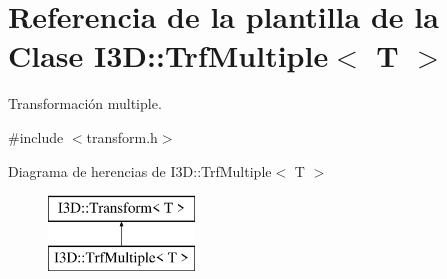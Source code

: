 \hypertarget{class_i3_d_1_1_trf_multiple}{}\section{Referencia de la plantilla de la Clase I3D\+:\+:Trf\+Multiple$<$ T $>$}
\label{class_i3_d_1_1_trf_multiple}


Transformación multiple.  




{\ttfamily \#include $<$transform.\+h$>$}

Diagrama de herencias de I3D\+:\+:Trf\+Multiple$<$ T $>$\begin{figure}[H]
\begin{center}
\leavevmode
\includegraphics[height=2.000000cm]{class_i3_d_1_1_trf_multiple}
\end{center}
\end{figure}
